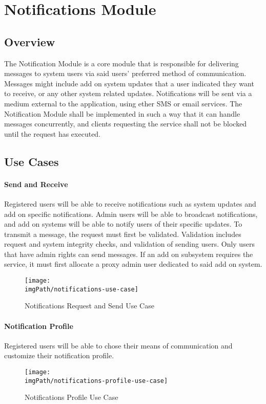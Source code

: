 \section{Notifications Module}

\subsection{Overview}
The Notification Module is a core module that is responsible for delivering  messages to system users via said users' preferred method of communication. Messages might include add on system updates that a user indicated they want to receive, or any other system related updates. Notifications will be sent via a medium external to the application, using ether SMS or email services. The Notification Module shall be implemented in such a way that it can handle messages concurrently, and clients requesting the service shall not be blocked until the request has executed.

\subsection{Use Cases}
\paragraph{Send and Receive}
Registered users will be able to receive notifications such as system updates and add on specific notifications. Admin users will be able to broadcast notifications, and add on systems will be able to notify users of their specific updates. To transmit a message, the request must first be validated. Validation includes request and system integrity checks, and validation of sending users. Only users that have admin rights can send messages. If an add on subsystem requires the service, it must first allocate a proxy admin user dedicated to said add on system.

\begin{figure}[H]
\centering
\texttt{[image: \\imgPath/notifications-use-case]}
\caption{Notifications Request and Send Use Case}
\end{figure}

\paragraph{Notification Profile}
Registered users will be able to chose their means of communication and customize their notification profile.
\begin{figure}[H]
\centering
\texttt{[image: \\imgPath/notifications-profile-use-case]}
\caption{Notifications Profile Use Case}
\end{figure}

